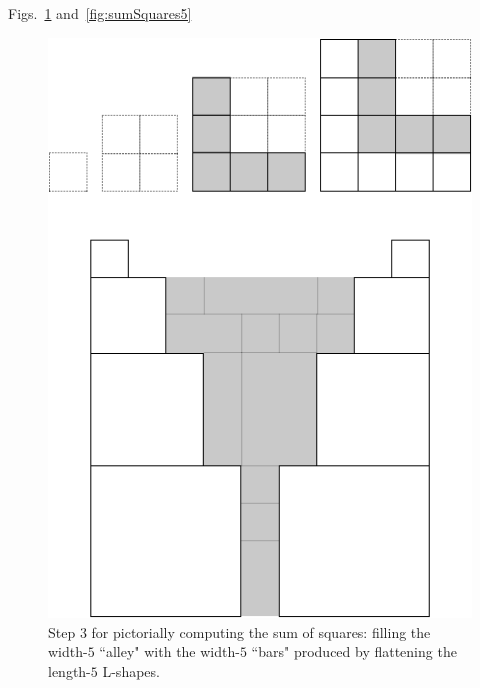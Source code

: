 \bigskip

Figs.~\ref{fig:sumSquares4} and~\ref{fig:sumSquares5}
\begin{figure}[ht]
\begin{center}
       \includegraphics[scale=0.3]{FiguresMaths/SumSquares4}
\caption{Step 3 for pictorially computing the sum of squares: filling the width-$5$ ``alley" with the width-$5$ ``bars" produced by flattening the length-$5$ L-shapes.}
       \label{fig:sumSquares4}
\end{center}
\end{figure}
